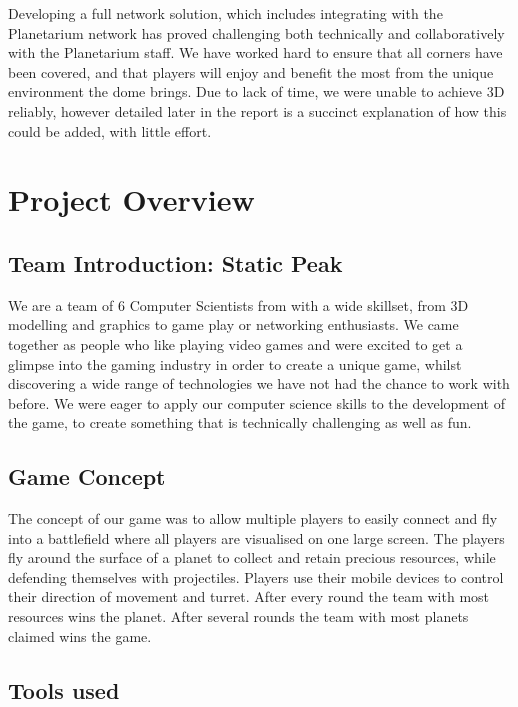 \documentclass[11pt,a4paper]{article}
\begin{document}
\noindent
 Developing a full network solution, which includes integrating with the Planetarium network has proved challenging both technically and collaboratively with the Planetarium staff. We have worked hard to ensure that all corners have been covered, and that players will enjoy and benefit the most from the unique environment the dome brings. Due to lack of time, we were unable to achieve 3D reliably, however detailed later in the report is a succinct explanation of how this could be added, with little effort.



\pagebreak







\section{Project Overview}

\subsection{Team Introduction: Static Peak} 
 We are a team of 6 Computer Scientists from with a wide skillset, from 3D modelling and graphics to game play or networking enthusiasts. We came together as people who like playing video games and were excited to get a glimpse into the gaming industry in order to create a unique game, whilst discovering a wide range of technologies we have not had the chance to work with before. We were eager to apply our computer science skills to the development of the game, to create something that is technically challenging as well as fun.

 \subsection{Game Concept}
  The concept of our game was to allow multiple players to easily connect and fly into a battlefield where all players are visualised on one large screen. The players fly around the surface of a planet to collect and retain precious resources, while defending themselves with projectiles. Players use their mobile devices to control their direction of movement and turret. After every round the team with most resources wins the planet. After several rounds the team with most planets claimed wins the game.

 \subsection{Tools used}
\end{document}
